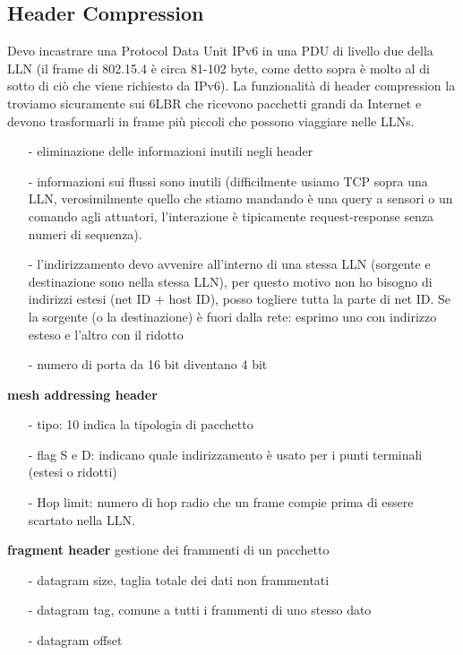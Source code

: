 \documentclass[12pt,italian]{report}
\begin{document}
\subsection{Header Compression}
Devo incastrare una Protocol Data Unit IPv6 in una PDU di livello due della LLN (il frame di 802.15.4 è circa 81-102 byte, come detto sopra è molto al di sotto di ciò che viene richiesto da IPv6). La funzionalità di header compression la troviamo sicuramente sui 6LBR che ricevono pacchetti grandi da Internet e devono trasformarli in frame più piccoli che possono viaggiare nelle LLNs. 
\begin{itemize}
    \item [-] eliminazione delle informazioni inutili negli header
    \item [-] informazioni sui flussi sono inutili (difficilmente usiamo TCP sopra una LLN, verosimilmente quello che stiamo mandando è una query a sensori o un comando agli attuatori, l'interazione è tipicamente request-response senza numeri di sequenza). 
    \item [-] l'indirizzamento devo avvenire all'interno di una stessa LLN (sorgente e destinazione sono nella stessa LLN), per questo motivo non ho bisogno di indirizzi estesi (net ID + host ID), posso togliere tutta la parte di net ID. Se la sorgente (o la destinazione) è fuori dalla rete: esprimo uno con indirizzo esteso e l'altro con il ridotto
    \item [-] numero di porta da 16 bit diventano 4 bit
    
\end{itemize}

\noindent \textbf{mesh addressing header} 
\begin{itemize}
    \item [-] tipo: 10 indica la tipologia di pacchetto
    \item [-] flag S e D: indicano quale indirizzamento è usato per i punti terminali (estesi o ridotti)
    \item [-] Hop limit: numero di hop radio che un frame compie prima di essere scartato nella LLN. 
\end{itemize}

\noindent \textbf{fragment header}
gestione dei frammenti di un pacchetto
\begin{itemize}
    \item[-] datagram size, taglia totale dei dati non frammentati
    \item[-] datagram tag, comune a tutti i frammenti di uno stesso dato 
    \item[-] datagram offset
\end{itemize}
  
\end{document}
